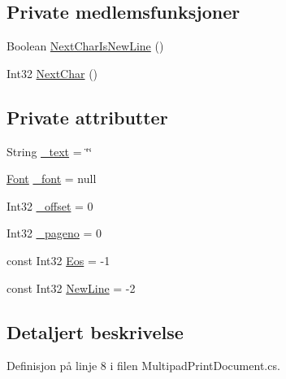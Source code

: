 \subsection*{Private medlemsfunksjoner}
\begin{DoxyCompactItemize}
\item 
Boolean \hyperlink{class_multipad_print_document_aab739e0161348dff7a3196588b97a293}{Next\+Char\+Is\+New\+Line} ()
\item 
Int32 \hyperlink{class_multipad_print_document_a0795165575b0075bff77d2fcc7c0699f}{Next\+Char} ()
\end{DoxyCompactItemize}
\subsection*{Private attributter}
\begin{DoxyCompactItemize}
\item 
String \hyperlink{class_multipad_print_document_ad8b42ce8bc5588c1a28b209c85dd8fa7}{\+\_\+text} = \char`\"{}\char`\"{}
\item 
\hyperlink{class_multipad_print_document_aaf1813fbc532697e2d3bfb95c33f9d19}{Font} \hyperlink{class_multipad_print_document_abfb15491f048283a8868a3b410f8b78e}{\+\_\+font} = null
\item 
Int32 \hyperlink{class_multipad_print_document_a5a30e0a4319d60a90ea0ec1f861d4afa}{\+\_\+offset} = 0
\item 
Int32 \hyperlink{class_multipad_print_document_a1b6cabd162baf6ce1c5256059fa1e840}{\+\_\+pageno} = 0
\item 
const Int32 \hyperlink{class_multipad_print_document_adfd2fe48dc1a582ea58044a93dda2353}{Eos} = -\/1
\item 
const Int32 \hyperlink{class_multipad_print_document_a4a051275c8477606d5ef1d8f89cc54ca}{New\+Line} = -\/2
\end{DoxyCompactItemize}


\subsection{Detaljert beskrivelse}


Definisjon på linje 8 i filen Multipad\+Print\+Document.\+cs.



